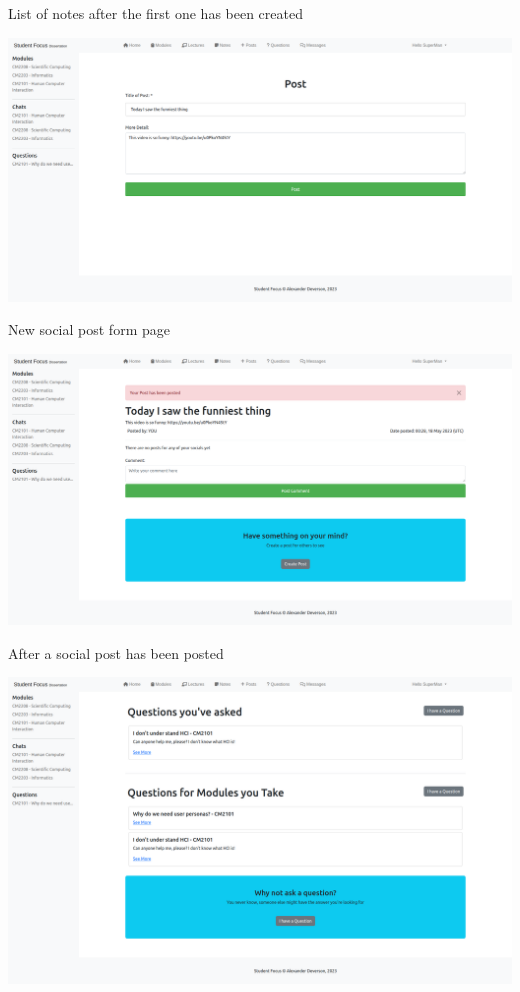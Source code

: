 List of notes after the first one has been created

\includegraphics[scale=0.20]{images/application/19 - post_new.png}

New social post form page

\includegraphics[scale=0.20]{images/application/20 - post_posted.png}

After a social post has been posted

\includegraphics[scale=0.20]{images/application/21 - all_questions.png}

